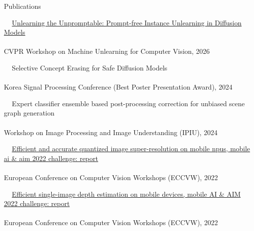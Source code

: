 \documentclass{resume} %
\newcommand{\mycolor}[1]{\textcolor{myurlcolor}{#1}}
\begin{document}
\begin{rSection}{Publications {}}


\textbullet~\,\, \href{https://arxiv.org/abs/2603.10445}{Unlearning the Unpromptable: Prompt-free Instance Unlearning in Diffusion Models}
\\ 
\\ \hspace*{1.5em}CVPR Workshop on Machine Unlearning for Computer Vision, 2026



\textbullet~\,\, {\mycolor{Selective Concept Erasing for Safe Diffusion Models}}
\\ 
\\ \hspace*{1.5em}Korea Signal Processing Conference (Best Poster Presentation Award), 2024

\textbullet~\,\, {\mycolor{Expert classifier ensemble based post-processing correction for unbiased scene graph generation}}
\\ 
\\ \hspace*{1.5em}Workshop on Image Processing and Image Understanding (IPIU), 2024


\textbullet~\,\, \href{https://link.springer.com/chapter/10.1007/978-3-031-25066-8_4}{Efficient and accurate quantized image super-resolution on mobile npus, mobile ai \& aim 2022 challenge: report
}
\\ 
\\ \hspace*{1.5em}European Conference on Computer Vision Workshops (ECCVW), 2022


\textbullet~\,\, \href{https://link.springer.com/chapter/10.1007/978-3-031-25066-8_4}{Efficient single-image depth estimation on mobile devices, mobile AI \& AIM 2022 challenge: report}
\\ 
\\ \hspace*{1.5em}European Conference on Computer Vision Workshops (ECCVW), 2022


\end{rSection}
\end{document}
